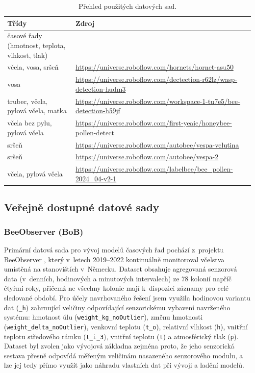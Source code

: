 \begin{table}[H]
    \centering
    \begin{tabular}{|m{4.5cm}|m{8cm}|}
    \hline
        \textbf{Třídy} & \textbf{Zdroj} \\
        \hline
        časové řady (hmotnost, teplota, vlhkost, tlak) & \cite{BeeObserver} \\
        \hline
        včela, vosa, sršeň & \url{https://universe.roboflow.com/hornets/hornet-asu50} \\
        \hline
        vosa & \url{https://universe.roboflow.com/dectection-r62lz/wasp-detection-hudm3} \\
        \hline
        trubec, včela, pylová včela, matka & \url{https://universe.roboflow.com/workspace-1-tu7e5/bee-detection-h59jf} \\
        \hline
        včela bez pylu, pylová včela & \url{https://universe.roboflow.com/first-yeaie/honeybee-pollen-detect} \\
        \hline
        sršeň & \url{https://universe.roboflow.com/autobee/vespa-velutina} \\
        \hline
        sršeň & \url{https://universe.roboflow.com/autobee/vespa-2} \\
        \hline
        včela, pylová včela & \url{https://universe.roboflow.com/labelbee/bee_pollen-2024_04-v2-1} \\
        \hline
    \end{tabular}
    \caption{Přehled použitých datových sad.}
    \label{tab:vyuzite_datasety}
\end{table}

\subsection*{Veřejně dostupné datové sady}

\subsubsection*{BeeObserver (BoB)}
Primární datová sada pro vývoj modelů časových řad pochází z~projektu BeeObserver \cite{BeeObserver}, který v~letech 2019--2022 kontinuálně monitoroval včelstva umístěná na stanovištích v~Německu. Dataset obsahuje agregovaná senzorová data (v~denních, hodinových a minutových intervalech) ze 78 kolonií napříč čtyřmi roky, přičemž ne všechny kolonie mají k~dispozici záznamy pro celé sledované období. Pro účely navrhovaného řešení jsem využila hodinovou variantu dat (\texttt{\_h}) zahrnující veličiny odpovídající senzorickému vybavení navrženého systému: hmotnost úlu (\texttt{weight\_kg\_noOutlier}), změnu hmotnosti (\texttt{weight\_delta\_noOutlier}), venkovní teplotu (\texttt{t\_o}), relativní vlhkost (\texttt{h}), vnitřní teplotu středového rámku (\texttt{t\_i\_3}), vnitřní teplotu (\texttt{t}) a atmosférický tlak (\texttt{p}). Dataset byl zvolen jako vývojová základna zejména proto, že jeho senzorická sestava přesně odpovídá měřeným veličinám nasazeného senzorového modulu, a lze jej tedy přímo využít jako náhradu vlastních dat při vývoji a ladění modelů.

